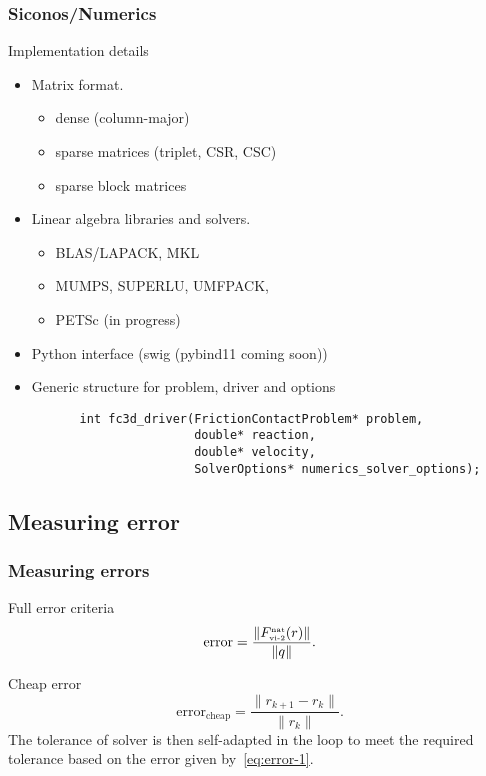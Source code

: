 \begin{frame}[fragile]
  \frametitle{Siconos/Numerics}
  \begin{block}
    {Implementation details}
     \begin{itemize}
     \item Matrix format.
       \begin{itemize}
       \item dense (column-major)
       \item sparse matrices (triplet, CSR, CSC)
       \item sparse block matrices
       \end{itemize}
     \item Linear algebra libraries and solvers.
       \begin{itemize}
       \item BLAS/LAPACK, MKL
       \item MUMPS, SUPERLU, UMFPACK,
       \item PETSc (in progress)
       \end{itemize}
     \item Python interface (swig (pybind11 coming soon))
     \item Generic structure for problem, driver and options
     \end{itemize}
   \end{block}
        {\small
        \begin{verbatim}
          int fc3d_driver(FrictionContactProblem* problem,
                          double* reaction,
                          double* velocity,
                          SolverOptions* numerics_solver_options);
       \end{verbatim}
     }
\end{frame}



\subsection{Measuring error}

\begin{frame}
  \frametitle{Measuring errors}
  \begin{block}{Full error criteria}
    \begin{equation}
      \label{eq:error-1}
      \mbox{error} = \frac{\|F^{\hbox{\tiny{nat}}}_{\hbox{\tiny{vi-2}}}(r)\|}{\|q\|}.
    \end{equation}
  \end{block}
  \begin{block}{Cheap error}
    \begin{equation}
      \label{eq:error-2}
      \mbox{error}_{\mbox{cheap}} = \frac{\|r_{k+1}-r_{k}\|}{\|r_k\|}.
    \end{equation}
    The tolerance of solver is then self-adapted in the loop to meet the required tolerance based on the error given by~\eqref{eq:error-1}.
  \end{block}
\end{frame}

